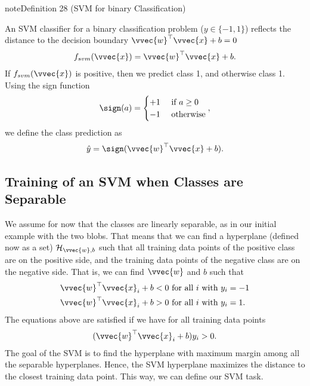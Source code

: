 \documentclass[letterpaper,10pt,english]{jupyterBook}
\begin{document}
\begin{sphinxadmonition}{note}{Definition 28 (SVM for binary Classification)}



\sphinxAtStartPar
An SVM classifier for a binary classification problem (\(y\in\{-1,1\}\)) reflects the distance to the decision boundary \(\vvec{w}^\top \vvec{x}+b=0\)
\begin{equation*}
\begin{split}f_{svm}(\vvec{x}) = \vvec{w}^\top \vvec{x}+b.\end{split}
\end{equation*}
If \(f_{svm}(\vvec{x})\) is positive, then we predict class 1, and otherwise class \sphinxhyphen{}1. Using the sign function
\begin{equation*}
\begin{split} \sign(a) = \begin{cases} +1 & \text{ if } a \geq 0 \\ -1 & \text{ otherwise}  \end{cases}, \end{split}
\end{equation*}
we define the class prediction as
\begin{equation*}
\begin{split}\hat{y} = \sign(\vvec{w}^\top \vvec{x}+b).\end{split}
\end{equation*}
\end{sphinxadmonition}


\subsection{Training of an SVM when Classes are Separable}
\label{\detokenize{classification_svms:training-of-an-svm-when-classes-are-separable}}
\sphinxAtStartPar
We assume for now that the classes are linearly separable, as in our initial example with the two blobs. That means that we can find a hyperplane (defined now as a set)
\(\mathcal{H}_{\vvec{w},b}\)
such that all training data points of the positive class are on the positive side, and the training data points of the negative class are on the negative side. That is, we can find \(\vvec{w}\) and \(b\) such that
\begin{align*}
\vvec{w}^\top \vvec{x}_i+b <0 & \text{ for all } i \text{ with }y_i=-1\\
\vvec{w}^\top \vvec{x}_i+b >0 & \text{ for all } i \text{ with }y_i=1.
\end{align*}
\sphinxAtStartPar
The equations above are satisfied if we have for all training data points
\begin{equation*}
\begin{split}
(\vvec{w}^\top \vvec{x}_i+b)y_i >0.
\end{split}
\end{equation*}
The goal of the SVM is to find the hyperplane with maximum margin among all the separable hyperplanes. Hence, the SVM hyperplane maximizes the distance to the closest training data point. This way, we can define our SVM task.
\end{document}
